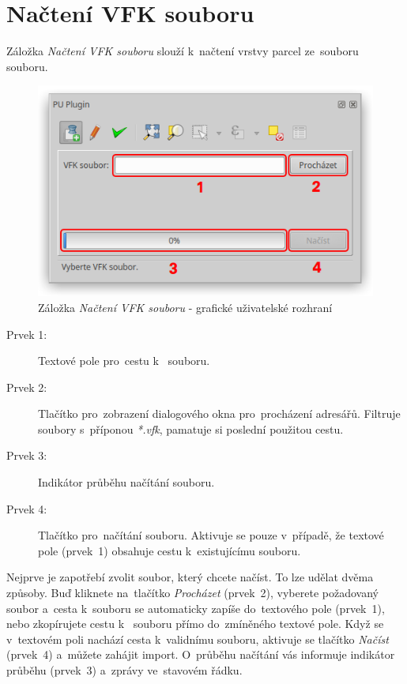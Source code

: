 \newpage

\section{Načtení VFK souboru}
\label{manual_nacteni_vfk}

Záložka \textit{Načtení VFK souboru} slouží k~načtení vrstvy parcel ze~souboru~ souboru.

	\begin{figure}[H]
		\centering
		\includegraphics[width=.55\textwidth]{./pictures/nacteni_vfk_gui.png}
		\caption[Záložka \textit{Načtení VFK souboru} - grafické uživatelské rozhraní]{Záložka \textit{Načtení VFK souboru} - grafické uživatelské rozhraní}
		\label{fig:manual_nacteni_vfk_gui}
 	\end{figure}

\begin{description}
	\item[Prvek 1:] Textové pole pro~cestu k~ souboru.
	\item[Prvek 2:] Tlačítko pro~zobrazení dialogového okna pro~procházení adresářů. Filtruje soubory s~příponou \textit{*.vfk}, pamatuje si poslední použitou cestu.
	\item[Prvek 3:] Indikátor průběhu načítání  souboru.
	\item[Prvek 4:] Tlačítko pro~načítání  souboru. Aktivuje se pouze v~případě, že textové pole (prvek~1) obsahuje cestu k~existujícímu  souboru.
\end{description}

Nejprve je zapotřebí zvolit  soubor, který chcete načíst. To lze udělat dvěma způsoby. Buď kliknete na~tlačítko \textit{Procházet} (prvek~2), vyberete požadovaný soubor a~cesta k~souboru se automaticky zapíše do~textového pole (prvek~1), nebo zkopírujete cestu k~ souboru přímo do~zmíněného textové pole. Když se v~textovém poli nachází cesta k~validnímu  souboru, aktivuje se tlačítko \textit{Načíst} (prvek~4) a~můžete zahájit import. O~průběhu načítání vás informuje indikátor průběhu (prvek~3) a~zprávy ve~stavovém řádku.


